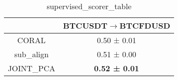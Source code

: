 \begin{table}[H]
\centering
\begin{tabular}{|c|c|}
\hline
&BTCUSDT$\rightarrow$BTCFDUSD\\
\hline\hline
\hline\hline
CORAL & 0.50 ± 0.01 \\
\hline\hline
\hline\hline
sub\_align & 0.51 ± 0.00 \\
JOINT\_PCA & \textbf{0.52 ± 0.01} \\
\hline\hline
\hline\hline
\hline
\end{tabular}
\caption{supervised\_scorer\_table}
\end{table}